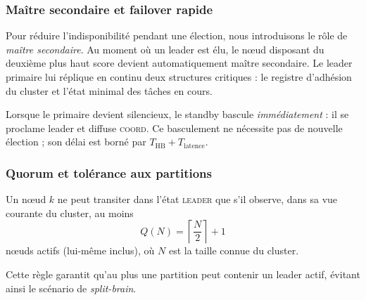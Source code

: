 \subsubsection{Maître secondaire et failover rapide}

Pour réduire l'indisponibilité pendant une élection, nous introduisons le rôle de \emph{maître secondaire}. Au moment où un leader est élu, le nœud disposant du deuxième plus haut score devient automatiquement maître secondaire. Le leader primaire lui réplique en continu deux structures critiques : le registre d'adhésion du cluster et l'état minimal des tâches en cours.

Lorsque le primaire devient silencieux, le standby bascule \emph{immédiatement} : il se proclame leader et diffuse \textsc{coord}. Ce basculement ne nécessite pas de nouvelle élection ; son délai est borné par $T_{\mathrm{HB}} + T_{\mathrm{latence}}$.

\subsubsection{Quorum et tolérance aux partitions}

\begin{definition}
Un nœud $k$ ne peut transiter dans l'état \textsc{leader} que s'il observe, dans sa vue courante du cluster, au moins
\[
Q(N) = \left\lceil \frac{N}{2} \right\rceil + 1
\]
nœuds actifs (lui-même inclus), où $N$ est la taille connue du cluster.
\end{definition}

Cette règle garantit qu'au plus une partition peut contenir un leader actif, évitant ainsi le scénario de \emph{split-brain}.
